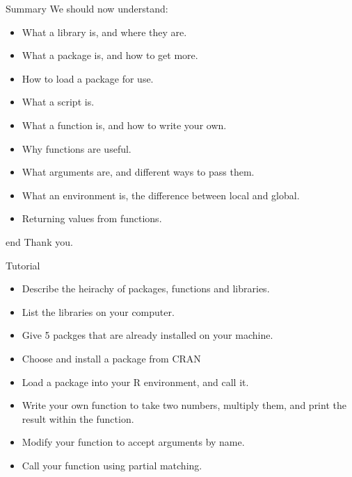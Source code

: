 \documentclass{beamer}\usepackage[]{graphicx}\usepackage[]{color}
\begin{document}
\begin{frame}[fragile]{Summary}
We should now understand:
\begin{itemize}
\item What a library is, and where they are.
\item What a package is, and how to get more.
\item How to load a package for use.
\item What a script is.
\item What a function is, and how to write your own.
\item Why functions are useful.
\item What arguments are, and different ways to pass them.
\item What an environment is, the difference between local and global.
\item Returning values from functions.
\end{itemize}
\end{frame}

\begin{frame}[fragile]{end}
Thank you.
\end{frame}

\begin{frame}[fragile]{Tutorial}



\begin{itemize}
\item Describe the heirachy of packages, functions and libraries.
\item List the libraries on your computer.
\item Give 5 packges that are already installed on your machine.
\item Choose and install a package from CRAN
\item Load a package into your R environment, and call it.
\item Write your own function to take two numbers, multiply them, and print the result within the function.
\item Modify your function to accept arguments by name.
\item Call your function using partial matching.
\end{itemize}
\end{frame}
\end{document}
